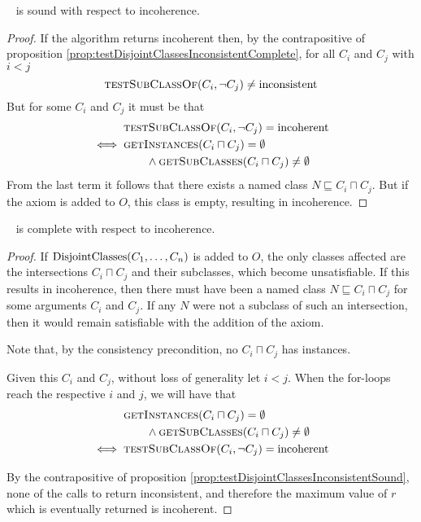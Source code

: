 \documentclass[paper.tex]{subfiles}
\begin{document}
\begin{proposition}
  \sloppy~
   is sound with respect to incoherence.
\end{proposition}
\begin{proof}
  If the algorithm returns incoherent then, by the contrapositive of proposition \ref{prop:testDisjointClassesInconsistentComplete}, for all $C_i$ and $C_j$ with $i < j$
  \[ \Call{testSubClassOf}{C_i, \neg C_j} \ne \inconsistent \]
  But for some $C_i$ and $C_j$ it must be that
  \begin{align*}
    & \Call{testSubClassOf}{C_i, \neg C_j} = \incoherent \\
    \iff{}& \Call{getInstances}{C_i \sqcap C_j} = \emptyset \\
      & \qquad \land \Call{getSubClasses}{C_i \sqcap C_j} \ne \emptyset
  \end{align*}
  From the last term it follows that there exists a named class $N \sqsubseteq C_i \sqcap C_j$.  But if the axiom is added to $O$, this class is empty, resulting in incoherence.
\end{proof}

\begin{proposition}
  \sloppy~
   is complete with respect to incoherence.
\end{proposition}
\begin{proof}
  If $\mathrm{DisjointClasses}(C_1, \ldots, C_n)$ is added to $O$, the only classes affected are the intersections $C_i \sqcap C_j$ and their subclasses, which become unsatisfiable.  If this results in incoherence, then there must have been a named class $N \sqsubseteq C_i \sqcap C_j$ for some arguments $C_i$ and $C_j$.  If any $N$ were not a subclass of such an intersection, then it would remain satisfiable with the addition of the axiom.

  Note that, by the consistency precondition, no $C_i \sqcap C_j$ has instances.

  Given this $C_i$ and $C_j$, without loss of generality let $i < j$.  When the for-loops reach the respective $i$ and $j$, we will have that
  \begin{align*}
    & \Call{getInstances}{C_i \sqcap C_j} = \emptyset \\
      & \qquad \land \Call{getSubClasses}{C_i \sqcap C_j} \ne \emptyset \\
    \iff{}& \Call{testSubClassOf}{C_i, \neg C_j} = \incoherent
  \end{align*}

  By the contrapositive of proposition \ref{prop:testDisjointClassesInconsistentSound}, none of the calls to  return inconsistent, and therefore the maximum value of $r$ which is eventually returned is incoherent.
\end{proof}
\end{document}
